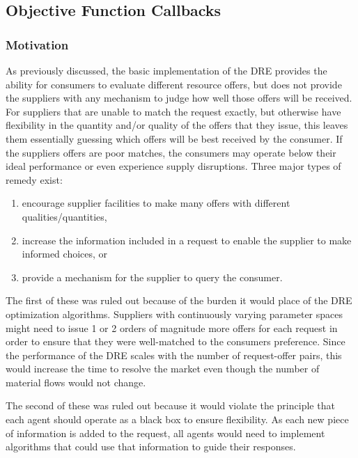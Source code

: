 \subsection{Objective Function Callbacks}\label{subsection:callback}

\subsubsection{Motivation}

As previously discussed, the basic implementation of the \gls{DRE} provides
the ability for consumers to evaluate different resource offers, but does not
provide the suppliers with any mechanism to judge how well those offers will
be received.  For suppliers that are unable to match the request exactly, but
otherwise have flexibility in the quantity and/or quality of the offers that
they issue, this leaves them essentially guessing which offers will be best
received by the consumer.  If the suppliers offers are poor matches, the
consumers may operate below their ideal performance or even experience supply
disruptions.  Three major types of remedy exist:
\begin{enumerate}
\item encourage supplier facilities to make many offers with different
  qualities/quantities,
\item increase the information included in a request to enable the supplier to
  make informed choices, or
\item provide a mechanism for the supplier to query the consumer.
\end{enumerate}

The first of these was ruled out because of the burden it would place of the
\gls{DRE} optimization algorithms.  Suppliers with continuously varying
parameter spaces might need to issue 1 or 2 orders of magnitude more offers for
each request in order to ensure that they were well-matched to the consumers
preference.  Since the performance of the \gls{DRE} scales with the number of
request-offer pairs, this would increase the time to resolve the market even
though the number of material flows would not change.

The second of these was ruled out because it would violate the
\Cyclus{} principle that each agent should operate as a black box to ensure
flexibility.  As each new piece of information is added to the request, all
agents would need to implement algorithms that could use that information to
guide their responses.  

